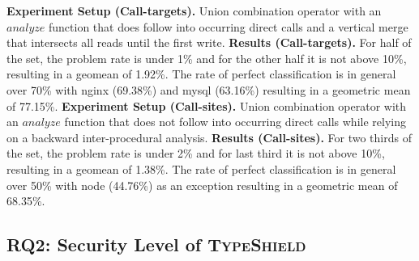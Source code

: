 \textbf{Experiment Setup (Call-targets).} Union combination operator with an $analyze$ function that does follow into occurring direct calls  and a vertical merge that intersects all reads until the first write.
\textbf{Results (Call-targets).} For half of the set, the problem rate is under 1\% and for the other half it is not above 10\%, resulting in a geomean of 1.92\%. The rate of perfect classification is in general over 70\% with nginx (69.38\%) and mysql (63.16\%)  resulting in a geometric mean of 77.15\%.
\textbf{Experiment Setup (Call-sites).} Union combination operator with an $analyze$ function that does not follow into occurring direct calls while relying on a backward inter-procedural analysis.
\textbf{Results (Call-sites).} For two thirds of the set, the problem rate is under 2\% and for last third it is not above 10\%, resulting in a geomean of 1.38\%.  The rate of perfect classification is in general over 50\% with node (44.76\%) as an exception resulting in a geometric mean of 68.35\%.


%
%
%
%
\subsection{RQ2: Security Level of \textsc{TypeShield}}
\label{section:typeshieldeffectiveness}

